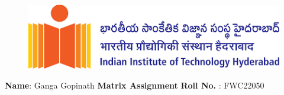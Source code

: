 \documentclass[10pt,a4paper]{article}
\begin{document}
\begin{figure}[!tbp]
 \centering
  \begin{minipage}[b]{0.4\textwidth}
  \includegraphics[scale=.25]{iitlogo.png} 
  \end{minipage}
\end{figure}
\raggedright \textbf{Name}:\hspace{1mm} Ganga Gopinath\hspace{3cm} \Large \textbf{Matrix Assignment}\hspace{2.5cm} %
\normalsize \textbf{Roll No.} :\hspace{1mm} FWC22050\vspace{1cm}
\end{document}
